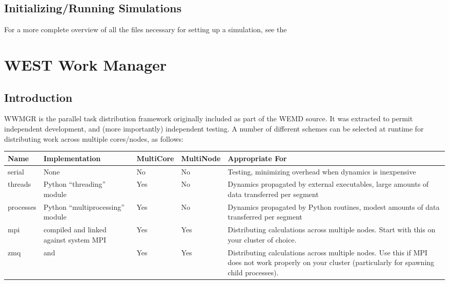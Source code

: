 \documentclass[letterpaper,10pt,english]{sphinxmanual}
\begin{document}
\subsection{Initializing/Running Simulations}
\label{\detokenize{users_guide/west_tools:initializing-running-simulations}}
For a more complete overview of all the files necessary for setting up a
simulation, see the {\hyperref[\detokenize{users_guide/west/setup:setup}]{}}


\section{WEST Work Manager}
\label{\detokenize{users_guide/wwmgr:west-work-manager}}\label{\detokenize{users_guide/wwmgr:wwmgr}}\label{\detokenize{users_guide/wwmgr::doc}}

\subsection{Introduction}
\label{\detokenize{users_guide/wwmgr:introduction}}
WWMGR is the parallel task distribution framework originally included as part
of the WEMD source. It was extracted to permit independent development, and
(more importantly) independent testing. A number of different schemes can be
selected at run\sphinxhyphen{}time for distributing work across multiple cores/nodes, as
follows:


\begin{savenotes}\sphinxattablestart
\centering
\begin{tabulary}{\linewidth}[t]{|T|T|T|T|T|}
\hline
\sphinxstyletheadfamily 
Name
&\sphinxstyletheadfamily 
Implementation
&\sphinxstyletheadfamily 
Multi\sphinxhyphen{}Core
&\sphinxstyletheadfamily 
Multi\sphinxhyphen{}Node
&\sphinxstyletheadfamily 
Appropriate For
\\
\hline
serial
&
None
&
No
&
No
&
Testing, minimizing overhead
when dynamics is inexpensive
\\
\hline
threads
&
Python “threading” module
&
Yes
&
No
&
Dynamics propagated by external
executables, large amounts of
data transferred per segment
\\
\hline
processes
&
Python “multiprocessing” module
&
Yes
&
No
&
Dynamics propagated by Python
routines, modest amounts of
data transferred per segment
\\
\hline
mpi
&
compiled and linked against system MPI
&
Yes
&
Yes
&
Distributing calculations
across multiple nodes. Start
with this on your cluster of
choice.
\\
\hline
zmq
&
and 
&
Yes
&
Yes
&
Distributing calculations
across multiple nodes. Use this
if MPI does not work properly
on your cluster (particularly
for spawning child processes).
\\
\hline
\end{tabulary}
\par
\sphinxattableend\end{savenotes}
\end{document}
